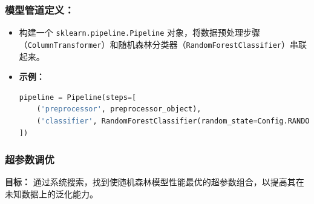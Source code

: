 \documentclass[withoutpreface,bwprint]{cumcmthesis}
\begin{document}
\subsubsection{\textbf{模型管道定义：}}
        \begin{itemize}
            \item 构建一个 \texttt{sklearn.pipeline.Pipeline} 对象，将数据预处理步骤（\texttt{ColumnTransformer}）和随机森林分类器（\texttt{RandomForestClassifier}）串联起来。
            \item \textbf{示例：}
            \begin{lstlisting}[language=Python]
pipeline = Pipeline(steps=[
    ('preprocessor', preprocessor_object),
    ('classifier', RandomForestClassifier(random_state=Config.RANDOM_STATE))
])
            \end{lstlisting}
        \end{itemize}

    
\subsubsection{超参数调优}

\textbf{目标：} 通过系统搜索，找到使随机森林模型性能最优的超参数组合，以提高其在未知数据上的泛化能力。
\end{document}
